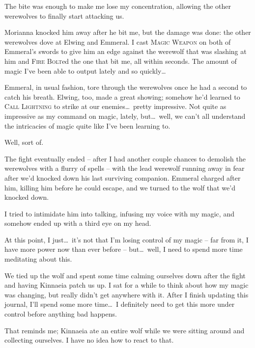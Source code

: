 The bite was enough to make me lose my concentration, allowing the other werewolves to finally start attacking us.

Morianna knocked him away after he bit me, but the damage was done: the other werewolves dove at Elwing and Emmeral. I cast \textsc{Magic Weapon} on both of Emmeral's swords to give him an edge against the werewolf that was slashing at him and \textsc{Fire Bolt}ed the one that bit me, all within seconds. The amount of magic I've been able to output lately and so quickly\dots

Emmeral, in usual fashion, tore through the werewolves once he had a second to catch his breath. Elwing, too, made a great showing; somehow he'd learned to \textsc{Call Lightning} to strike at our enemies\dots\ pretty impressive. Not quite as impressive as my command on magic, lately, but\dots\ well, we can't all understand the intricacies of magic quite like I've been learning to.

Well, sort of.

The fight eventually ended -- after I had another couple chances to demolish the werewolves with a flurry of spells -- with the lead werewolf running away in fear after we'd knocked down his last surviving companion. Emmeral charged after him, killing him before he could escape, and we turned to the wolf that we'd knocked down.

I tried to intimidate him into talking, infusing my voice with my magic, and somehow ended up with a third eye on my head.

At this point, I just\dots\ it's not that I'm losing control of my magic -- far from it, I have more power now than ever before -- but\dots\ well, I need to spend more time meditating about this.

We tied up the wolf and spent some time calming ourselves down after the fight and having Kinnaeia patch us up. I sat for a while to think about how my magic was changing, but really didn't get anywhere with it. After I finish updating this journal, I'll spend some more time\dots\ I definitely need to get this more under control before anything bad happens.

\pause

That reminds me; Kinnaeia ate an entire wolf while we were sitting around and collecting ourselves. I have no idea how to react to that.

\pause

